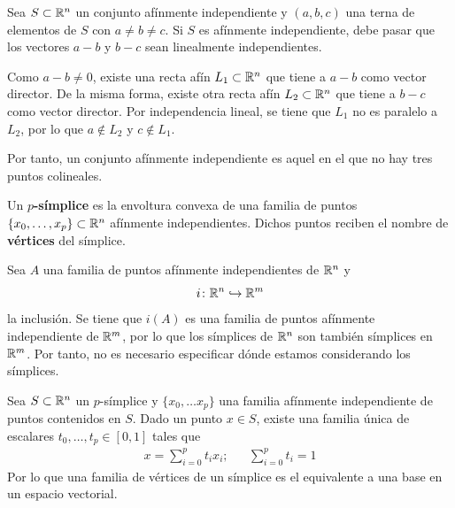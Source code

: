 Sea $S \subset \mathbb{R}^n$ un conjunto afínmente independiente y $(a,b,c)$ una
terna de elementos de $S$ con $a\neq b \neq c$. Si $S$ es afínmente
independiente, debe pasar que los vectores $a-b$ y $b-c$ sean linealmente
independientes.

Como $a-b\neq 0$, existe una recta afín $L_1 \subset \mathbb{R}^n$ que tiene a
$a-b$ como vector director. De la misma forma, existe otra recta afín
$L_2 \subset \mathbb{R}^n$ que tiene a $b-c$ como vector director. Por independencia
lineal, se tiene que $L_1$ no es paralelo a $L_2$, por lo que $a \not\in L_2$ y
$c \not\in L_1$.

Por tanto, un conjunto afínmente independiente es aquel en el que no hay tres
puntos colineales.

\begin{definition}
Un \textbf{$p$-símplice} es la envoltura convexa de una familia de puntos $\{x_0,
\dots,x_p\} \subset \mathbb{R}^n$ afínmente independientes. Dichos puntos reciben el
nombre de \textbf{vértices} del símplice.
\end{definition}


Sea $A$ una familia de puntos afínmente independientes de $\mathbb{R}^n$ y
\[i\colon \mathbb{R}^n \hookrightarrow \mathbb{R}^m\]
la inclusión. Se tiene que $i(A)$ es una familia de puntos afínmente
independiente de $\mathbb{R}^m$, por lo que los símplices de $\mathbb{R}^n$ son también
símplices en $\mathbb{R}^m$. Por tanto, no es necesario especificar dónde estamos
considerando los símplices.

\begin{proposition}
Sea $S\subset \mathbb{R}^n$ un $p$-símplice y $\{x_0,\dots x_p\}$ una familia
afínmente independiente de puntos contenidos en $S$. Dado un punto $x \in S$,
existe una familia única de escalares $t_0,\dots, t_p \in [0,1]$ tales que
\begin{align*}
x=\sum^p_{i=0}t_ix_i; && \sum^p_{i=0}t_i=1
\end{align*}
Por lo que una familia de vértices de un símplice es el equivalente a una base
en un espacio vectorial.
\end{proposition}

